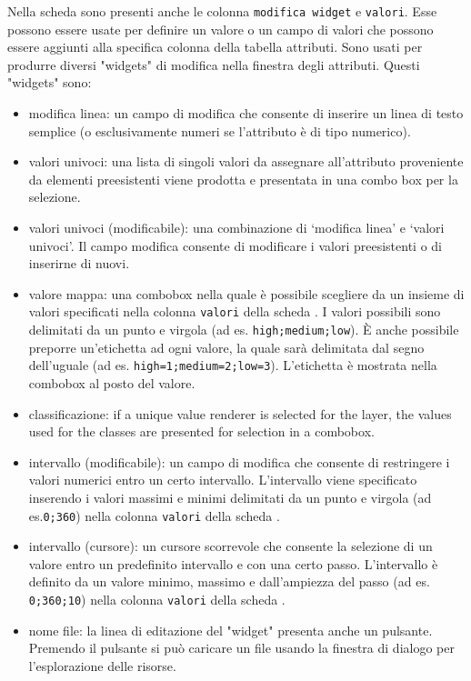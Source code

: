 
Nella scheda  sono presenti anche le colonna
\texttt{modifica widget} e \texttt{valori}. Esse possono essere usate per
definire un valore o un campo di valori che possono essere aggiunti alla
specifica colonna della tabella attributi. 
Sono usati per produrre diversi "widgets" di modifica nella finestra degli
attributi. Questi "widgets" sono:

\begin{itemize}
\item modifica linea: un campo di modifica che consente di inserire un linea
di testo semplice (o esclusivamente numeri se l'attributo è di tipo numerico).
\item valori univoci: una lista di singoli valori da assegnare all'attributo
proveniente da elementi preesistenti viene prodotta e presentata in una combo
box per la selezione.
\item valori univoci (modificabile): una combinazione di `modifica linea' e
`valori univoci'. Il campo modifica consente di modificare i valori
preesistenti o di inserirne di nuovi.
\item valore mappa: una combobox nella quale è possibile scegliere da un
insieme di valori specificati nella colonna \texttt{valori} della scheda
. I valori possibili sono delimitati da un punto e virgola (ad es.
\verb|high;medium;low|). È anche possibile preporre un'etichetta ad ogni
valore, la quale sarà delimitata dal segno dell'uguale (ad es.
\verb|high=1;medium=2;low=3|). L'etichetta è mostrata nella combobox al posto
del valore.
\item classificazione: if a unique value renderer is selected for the layer, the
values used for the classes are presented for selection in a combobox.
\item intervallo (modificabile): un campo di modifica che consente di
restringere i valori numerici entro un certo intervallo. L'intervallo viene
specificato inserendo i valori massimi e minimi delimitati da un punto e virgola (ad
es.\verb|0;360|) nella colonna \texttt{valori} della scheda .
\item intervallo (cursore): un cursore scorrevole che consente la selezione di
un valore entro un predefinito intervallo e con una certo passo.
L'intervallo è definito da un valore minimo, massimo e dall'ampiezza del passo
(ad es. \verb|0;360;10|) nella colonna \texttt{valori} della scheda .
\item nome file: la linea di editazione del "widget" presenta anche un
pulsante. Premendo il pulsante si può caricare un file usando la finestra di
dialogo per l'esplorazione delle risorse.
\end{itemize}

